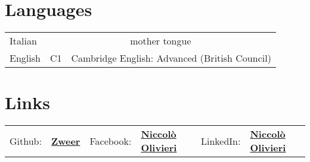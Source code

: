 \documentclass[letterpaper]{deedy-resume} %
\begin{document}
\begin{minipage}[t]{0.66\textwidth}








\section{Languages}

\begin{tabular}{lcl}
Italian & \multicolumn{2}{c}{mother tongue}\\
English & C1 & Cambridge English: Advanced (British Council)
\end{tabular}

\sectionspace %


\section{Links} 

\begin{tabular}{rlrlrl}
Github: & \href{https://github.com/Zweer}{\bf Zweer} &
Facebook: & \href{https://www.facebook.com/zweer}{\bf Niccolò Olivieri} &
LinkedIn: & \href{http://lnkd.in/b9ZrkZq}{\bf Niccolò Olivieri} \\
\end{tabular}


\end{minipage}
\end{document}

